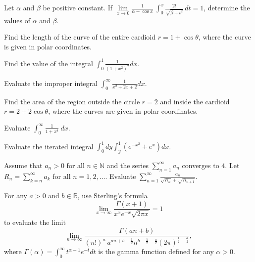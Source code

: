 \begin{problem} Let $\alpha$ and $\beta$ be positive constant. If $\lim\limits_{x\to 0}\displaystyle{\frac{1}{\alpha-\cos{ x}}\ \int_0^x\frac{2t}{\sqrt{\beta+t^2}}\,dt=1}$, determine the values of $\alpha$ and $\beta$.
\end{problem}

\begin{problem} Find the length of the curve of the entire cardioid $r=1+\cos{\theta}$, where the curve is given in polar coordinates.
\end{problem}

\begin{problem} Find the value of the integral $\displaystyle{\int_0^1\frac{1}{(1+x^2)^2}dx}$.
\end{problem}

\begin{problem} Evaluate the improper integral $\displaystyle{\int_0^\infty \frac{1}{x^2+2x+2}dx}$.
\end{problem}

\begin{problem}  Find the area of the region outside the circle $r=2$ and inside the cardioid $r=2+2\cos{\theta}$, where the curves are given in polar coordinates.
\end{problem}

\begin{problem} Evaluate $\displaystyle{\int_0^\infty \frac{1}{1+x^4}\ dx}$.
\end{problem}

\begin{problem} Evaluate the iterated integral $\displaystyle{\int_0^1dy\int_y^1(e^{-x^2}+e^x)dx}$.
\end{problem}

\begin{problem} Assume that $a_n>0$ for all $n\in\mathbb{N}$ and the series $\displaystyle{\sum_{n=1}^\infty a_n}$ converges to $4$. Let $\displaystyle{R_n=\sum_{k=n}^\infty a_k}$ for all $n=1, 2,\dots$. Evaluate $\displaystyle{\sum_{n=1}^\infty \frac{a_n}{\sqrt{R_n}+\sqrt{R_{n+1}}}}$.
\end{problem}

\begin{problem}  For any $a>0$ and $b\in\mathbb{R}$, use Sterling's formula
 \[
 \lim\limits_{x\to\infty}\frac{\Gamma(x+1)}{x^x e^{-x}\sqrt{2\pi x}}=1
 \]
   to evaluate the limit 
 \[
  \lim\limits_{n\to\infty}\frac{\Gamma(an+b)}{(n!)^a\: a^{an+b-\frac12}n^{b-\frac12-\frac{a}{2}}(2\pi)^{\frac12-\frac{a}{2}}},
 \]
 where $\Gamma(\alpha)=\int_0^\infty t^{\alpha-1}e^{-t}dt$ is the gamma function defined for any $\alpha>0$.
\end{problem}


